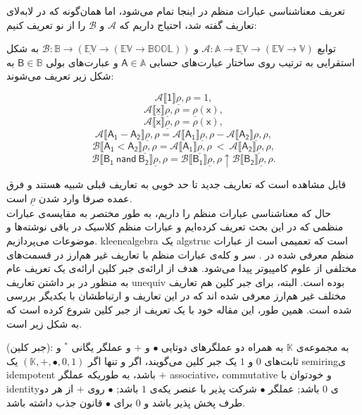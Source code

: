 تعریف معناشناسی عبارات منظم در اینجا تمام می‌شود، اما همان‌گونه که در لا‌به‌لای تعاریف گفته ‌شد، احتیاج داریم که $\mathcal{A}$ و $\mathcal{B}$ را از نو تعریف کنیم:
\begin{defn}
	توابع 
	$\mathcal{A}:\mathbb{A}\rightarrow \mathbb{\underline{EV}} \rightarrow
	(\mathbb{EV} \rightarrow \mathbb{V})$
	و 
	$\mathcal{B}:\mathbb{B}\rightarrow (\mathbb{\underline{EV}} \rightarrow
	(\mathbb{EV} \rightarrow \mathbb{BOOL}))$
	به شکل استقرایی به ترتیب روی ساختار عبارت‌های حسابی 
	$\mathsf{A}\in\mathbb{A}$
	و عبارت‌های بولی
	$\mathsf{B} \in \mathbb{B}$
	به شکل زیر تعریف می‌شوند:
	
	
$$\mathcal{A}\llbracket\mathsf{1}\rrbracket\underline{\rho},\rho=1,$$
$$\mathcal{A}\llbracket\mathsf{\underline{\mathsf{x}}}\rrbracket\underline{\rho},\rho= \underline{\rho}(\mathsf{x}),$$
$$\mathcal{A}\llbracket\mathsf{\mathsf{x}}\rrbracket\underline{\rho},\rho= \rho(\mathsf{x}),$$
$$\mathcal{A}\llbracket\mathsf{A_1 - A_2}\rrbracket\underline{\rho},\rho= 
\mathcal{A}\llbracket\mathsf{A_1}\rrbracket\underline{\rho},\rho - \mathcal{A}\llbracket\mathsf{A_2}\rrbracket\underline{\rho},\rho,$$
$$\mathcal{B}\llbracket\mathsf{A_1 < A_2}\rrbracket\underline{\rho},\rho=
	\mathcal{A}\llbracket\mathsf{A_1}\rrbracket\underline{\rho},\rho\: <\: \mathcal{A}\llbracket\mathsf{A_2}\rrbracket\underline{\rho},\rho,$$
$$\mathcal{B}\llbracket\mathsf{B_1\:nand\:B_2}\rrbracket\underline{\rho},\rho=
\mathcal{B}\llbracket\mathsf{B_1}\rrbracket\underline{\rho},\rho \uparrow 
\mathcal{B}\llbracket\mathsf{B_2}\rrbracket\underline{\rho},\rho .$$
\end{defn}
قابل مشاهده است که تعاریف جدید تا حد خوبی به تعاریف قبلی شبیه هستند و فرق عمده صرفا وارد شدن $\underline{\rho}$ است.\\

حال که معناشناسی عبارات منظم را داریم، به طور مختصر به مقایسه‌ی عبارات منظمی که در این بحث تعریف کرده‌ایم و عبارات منظم کلاسیک در باقی نوشته‌ها و موضوعات می‌پردازیم. \gls{kleenealgebra} یک  \gls*{algstruc} است که تعمیمی است از عبارات منظم معرفی شده در \cite{kleene56}. سر و کله‌ی عبارات منظم با تعاریف غیر هم‌ارز در قسمت‌های مختلفی از علوم کامپیوتر پیدا می‌شود. هدف از ارائه‌ی جبر کلین ارائه‌ی یک تعریف عام به منظور در بر داشتن تعاریف \gls*{unequiv} بوده است. البته، برای جبر کلین هم تعاریف مختلف غیر هم‌ارز معرفی شده اند که در \cite{DexterKleene} این تعاریف و ارتباطشان با یکدیگر بررسی شده‌ است. همین طور، این مقاله خود با یک تعریف از جبر کلین شروع کرده است که به شکل زیر است. 
\begin{defn}
	(جبر کلین): به مجموعه‌ی $\mathbb{K}$ به همراه دو عملگرهای دوتایی $\bullet$ و $+$ و عملگر یگانی $^*$ و ثابت‌های $0$ و $1$ یک جبر کلین می‌گویند، اگر و تنها اگر 
	$(\mathbb{K}, +, \bullet, 0 , 1)$
	یک \gls*{semiring}ی \gls*{idempotent} باشد، به طوریکه عملگر $+$ \gls*{associative}، \gls*{commutative} و خودتوان با \gls*{identity}‌ی $0$ باشد; عملگر $\bullet$ شرکت پذیر با عنصر یکه‌ی $1$ باشد; $\bullet$ روی $+$ از هر دو طرف پخش پذیر باشد و $0$ برای $\bullet$ قانون جذب داشته باشد.
\end{defn}

